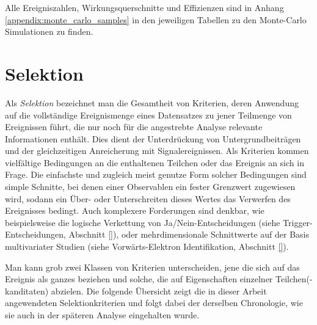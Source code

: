 Alle Ereigniszahlen, Wirkungsquerschnitte und Effizienzen sind in Anhang
\ref{appendix:monte_carlo_samples} in den jeweiligen Tabellen zu den
Monte-Carlo Simulationen zu finden.



\section{Selektion}
\label{data_sim_selection:selection}


Als \textit{Selektion} bezeichnet man die Gesamtheit von Kriterien, deren
Anwendung auf die vollständige Ereignismenge eines Datensatzes zu jener
Teilmenge von Ereignissen führt, die nur noch für die angestrebte Analyse
relevante Informationen enthält. Dies dient der Unterdrückung von
Untergrundbeiträgen und der gleichzeitigen Anreicherung mit Signalereignissen.
Als Kriterien kommen vielfältige Bedingungen an die enthaltenen Teilchen oder
das Ereignis an sich in Frage. Die einfachste und zugleich meist genutze Form
solcher Bedingungen sind simple Schnitte, bei denen einer Observablen ein
fester Grenzwert zugewiesen wird, sodann ein Über- oder Unterschreiten dieses
Wertes das Verwerfen des Ereignisses bedingt. Auch komplexere Forderungen sind
denkbar, wie beispielsweise die logische Verkettung von Ja/Nein-Entscheidungen
(siehe Trigger-Entscheidungen, Abschnitt \ref{}),
oder mehrdimensionale Schnittwerte auf der Basis multivariater Studien (siehe
Vorwärts-Elektron Identifikation, Abschnitt \ref{}).

Man kann grob zwei Klassen von Kriterien unterscheiden, jene die sich auf das
Ereignis als ganzes beziehen und solche, die auf Eigenschaften einzelner
Teilchen(-kanditaten) abzielen. Die folgende Übersicht zeigt die in dieser
Arbeit angewendeten Selektionkriterien und folgt dabei der derselben
Chronologie, wie sie auch in der späteren Analyse eingehalten wurde.

